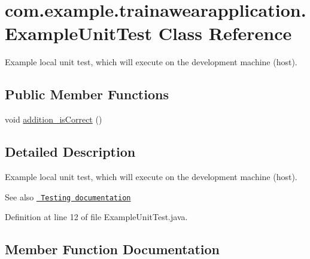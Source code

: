 \hypertarget{classcom_1_1example_1_1trainawearapplication_1_1_example_unit_test}{}\section{com.\+example.\+trainawearapplication.\+Example\+Unit\+Test Class Reference}
\label{classcom_1_1example_1_1trainawearapplication_1_1_example_unit_test}


Example local unit test, which will execute on the development machine (host).  


\subsection*{Public Member Functions}
\begin{DoxyCompactItemize}
\item 
void \mbox{\hyperlink{classcom_1_1example_1_1trainawearapplication_1_1_example_unit_test_aa3f758adb6bd996ab30416384062f311}{addition\+\_\+is\+Correct}} ()
\end{DoxyCompactItemize}


\subsection{Detailed Description}
Example local unit test, which will execute on the development machine (host). 

\begin{DoxySeeAlso}{See also}
\href{http://d.android.com/tools/testing}{\texttt{ Testing documentation}} 
\end{DoxySeeAlso}


Definition at line 12 of file Example\+Unit\+Test.\+java.



\subsection{Member Function Documentation}
\mbox{\label{classcom_1_1example_1_1trainawearapplication_1_1_example_unit_test_aa3f758adb6bd996ab30416384062f311}} 
